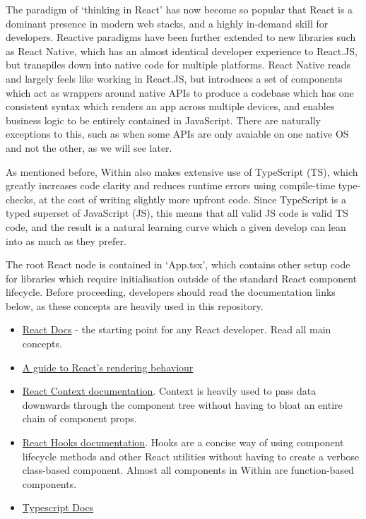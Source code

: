 The paradigm of `thinking in React' has now become so popular that React is a dominant presence in modern web stacks, and a highly in-demand skill for developers. Reactive paradigms have been further extended to new libraries such as React Native, which has an almost identical developer experience to React.JS, but transpiles down into native code for multiple platforms. React Native reads and largely feels like working in React.JS, but introduces a set of components which act as wrappers around native APIs to produce a codebase which has one consistent syntax which renders an app across multiple devices, and enables business logic to be entirely contained in JavaScript. There are naturally exceptions to this, such as when some APIs are only avaiable on one native OS and not the other, as we will see later.

As mentioned before, Within also makes extensive use of TypeScript (TS), which greatly increases code clarity and reduces runtime errors using compile-time type-checks, at the cost of writing slightly more upfront code. Since TypeScript is a typed superset of JavaScript (JS), this means that all valid JS code is valid TS code, and the result is a natural learning curve which a given develop can lean into as much as they prefer.

The root React node is contained in `App.tsx', which contains other setup code for libraries which require initialisation outside of the standard React component lifecycle. Before proceeding, developers should read the documentation links below, as these concepts are heavily used in this repository.

\begin{itemize}
    \item \href{https://reactjs.org/docs/hello-world.html}{React Docs} - the starting point for any React developer. Read all main concepts.
    \item \href{https://blog.isquaredsoftware.com/2020/05/blogged-answers-a-mostly-complete-guide-to-react-rendering-behavior/#rendering-process-overview}{A guide to React's rendering behaviour}
    \item \href{https://reactjs.org/docs/context.html}{React Context documentation}. Context is heavily used to pass data downwards through the component tree without having to bloat an entire chain of component props.
    \item \href{https://reactjs.org/docs/hooks-intro.html}{React Hooks documentation}. Hooks are a concise way of using component lifecycle methods and other React utilities without having to create a verbose class-based component. Almost all components in Within are function-based components.
    \item \href{https://www.typescriptlang.org/docs/}{Typescript Docs}
\end{itemize}

